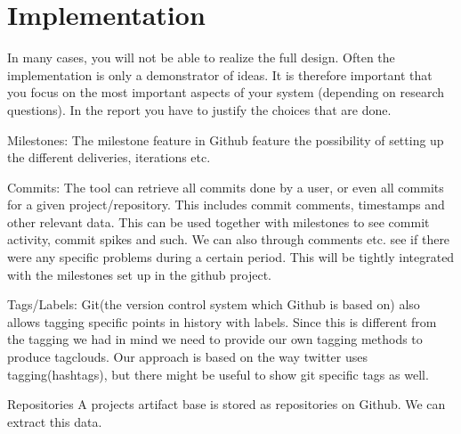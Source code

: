\chapter{Implementation}
In many cases, you will not be able to realize the full design. Often the implementation is only a demonstrator of ideas. 
It is therefore important that you focus on the most important aspects of your system (depending on research questions). 
In the report you have to justify the choices that are done.

Milestones:
The milestone feature in Github feature the possibility of setting up the different deliveries, iterations etc.

Commits:
The tool can retrieve all commits done by a user, or even all commits for a given project/repository. This includes commit comments, timestamps and other relevant data. This can be used together with milestones to see commit activity, commit spikes and such. We can also through comments etc. see if there were any specific problems during a certain period. This will be tightly integrated with the milestones set up in the github project. 

Tags/Labels:
Git(the version control system which Github is based on) also allows tagging specific points in history with labels. Since this is different from the tagging we had in mind we need to provide our own tagging methods to produce tagclouds. Our approach is based on the way twitter uses tagging(hashtags), but there might be useful to show git specific tags as well.

Repositories
A projects artifact base is stored as repositories on Github. We can extract this data.
